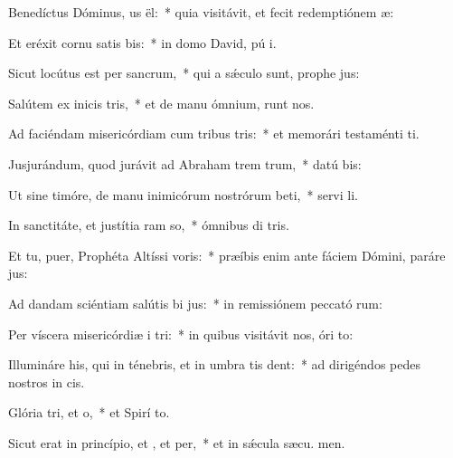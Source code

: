 \item Benedíctus Dóminus, us ël:~* quia visitávit, et fecit redemptiónem  æ:
\item Et eréxit cornu satis bis:~* in domo David, pú i.
\item Sicut locútus est per  sancrum,~* qui a sǽculo sunt, prophe jus:
\item Salútem ex inicis tris,~* et de manu ómnium,  runt nos.
\item Ad faciéndam misericórdiam cum tribus tris:~* et memorári testaménti  ti.
\item Jusjurándum, quod jurávit ad Abraham trem trum,~* datú  bis:
\item Ut sine timóre, de manu inimicórum nostrórum beti,~* servi li.
\item In sanctitáte, et justítia ram so,~* ómnibus di tris.
\item Et tu, puer, Prophéta Altíssi voris:~* præíbis enim ante fáciem Dómini, paráre  jus:
\item Ad dandam sciéntiam salútis bi jus:~* in remissiónem peccató rum:
\item Per víscera misericórdiæ i tri:~* in quibus visitávit nos, óri  to:
\item Illumináre his, qui in ténebris, et in umbra tis dent:~* ad dirigéndos pedes nostros in  cis.
\item Glória tri, et o,~* et Spirí to.
\item Sicut erat in princípio, et , et per,~* et in sǽcula sæcu. men.
